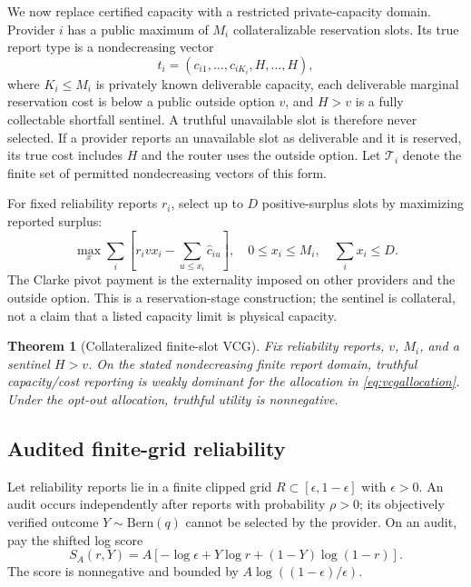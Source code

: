 \documentclass[11pt]{article}
\newtheorem{theorem}{Theorem}
\theoremstyle{definition}
\begin{document}
We now replace certified capacity with a restricted private-capacity domain.
Provider $i$ has a public maximum of $M_i$ collateralizable reservation slots.
Its true report type is a nondecreasing vector
\[
 t_i=(c_{i1},\ldots,c_{iK_i},H,\ldots,H),
\]
where $K_i\leq M_i$ is privately known deliverable capacity, each deliverable
marginal reservation cost is below a public outside option $v$, and
$H>v$ is a fully collectable shortfall sentinel. A truthful unavailable slot is
therefore never selected. If a provider reports an unavailable slot as
deliverable and it is reserved, its true cost includes $H$ and the router uses
the outside option. Let $\mathcal T_i$ denote the finite set of permitted
nondecreasing vectors of this form.

For fixed reliability reports $r_i$, select up to $D$ positive-surplus slots
by maximizing reported surplus:
\begin{equation}
\label{eq:vcgallocation}
 \max_x\sum_i\left[r_i v x_i-\sum_{u\leq x_i}\hat c_{iu}\right],
 \quad 0\leq x_i\leq M_i,\quad \sum_i x_i\leq D.
\end{equation}
The Clarke pivot payment is the externality imposed on other providers and the
outside option. This is a reservation-stage construction; the sentinel is
collateral, not a claim that a listed capacity limit is physical capacity.

\begin{theorem}[Collateralized finite-slot VCG]
\label{thm:capacityvcg}
Fix reliability reports, $v$, $M_i$, and a sentinel $H>v$. On the stated
nondecreasing finite report domain, truthful capacity/cost reporting is weakly
dominant for the allocation in \cref{eq:vcgallocation}. Under the opt-out
allocation, truthful utility is nonnegative.
\end{theorem}

\subsection{Audited finite-grid reliability}

Let reliability reports lie in a finite clipped grid
$R\subset[\epsilon,1-\epsilon]$ with $\epsilon>0$. An audit occurs
independently after reports with probability $\rho>0$; its objectively verified
outcome $Y\sim\mathrm{Bern}(q)$ cannot be selected by the provider. On an
audit, pay the shifted log score
\begin{equation}
\label{eq:score}
 S_A(r,Y)=A[-\log\epsilon+Y\log r+(1-Y)\log(1-r)].
\end{equation}
The score is nonnegative and bounded by
$A\log((1-\epsilon)/\epsilon)$.
\end{document}

